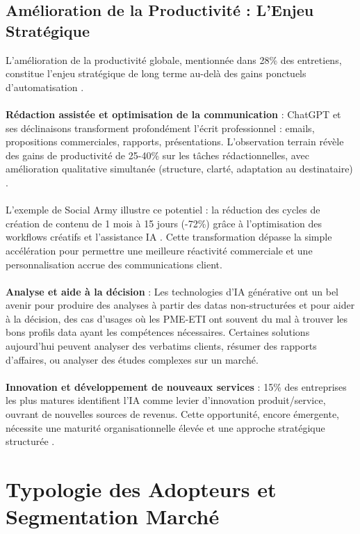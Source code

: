 \subsection{Amélioration de la Productivité : L'Enjeu Stratégique}

L'amélioration de la productivité globale, mentionnée dans 28\% des entretiens, constitue l'enjeu stratégique de long terme au-delà des gains ponctuels d'automatisation \cite{brynjolfsson2017business}.
\\\\
\textbf{Rédaction assistée et optimisation de la communication} : ChatGPT et ses déclinaisons transforment profondément l'écrit professionnel : emails, propositions commerciales, rapports, présentations. L'observation terrain révèle des gains de productivité de 25-40\% sur les tâches rédactionnelles, avec amélioration qualitative simultanée (structure, clarté, adaptation au destinataire) \cite{luwai2025meetings}.
\\\\
L'exemple de Social Army illustre ce potentiel : la réduction des cycles de création de contenu de 1 mois à 15 jours (-72\%) grâce à l'optimisation des workflows créatifs et l'assistance IA \cite{luwai2025aesio}. Cette transformation dépasse la simple accélération pour permettre une meilleure réactivité commerciale et une personnalisation accrue des communications client.
\\\\
\textbf{Analyse et aide à la décision} : Les technologies d’IA générative ont un bel avenir pour produire des analyses à partir des datas non-structurées et pour aider à la décision, des cas d’usages où les PME-ETI ont souvent du mal à trouver les bons profils data ayant les compétences nécessaires. Certaines solutions aujourd’hui peuvent analyser des verbatims clients, résumer des rapports d’affaires, ou analyser des études complexes sur un marché.
\\\\
\textbf{Innovation et développement de nouveaux services} : 15\% des entreprises les plus matures identifient l'IA comme levier d'innovation produit/service, ouvrant de nouvelles sources de revenus. Cette opportunité, encore émergente, nécessite une maturité organisationnelle élevée et une approche stratégique structurée \cite{christensen1997innovator}.

\section{Typologie des Adopteurs et Segmentation Marché}

